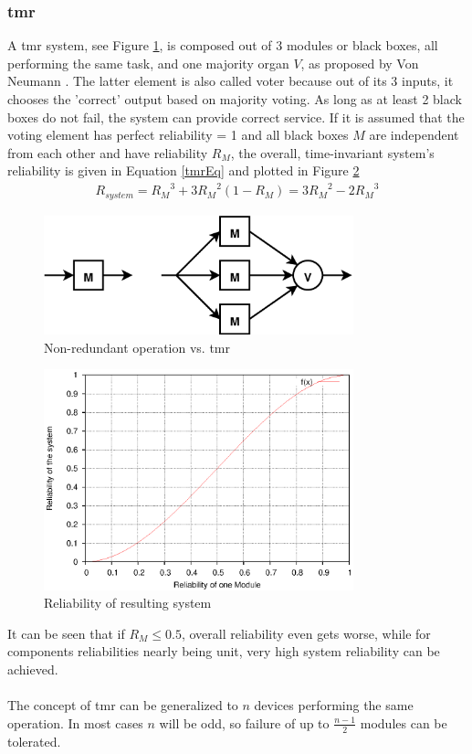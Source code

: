 \subsubsection{\gls{tmr}}
A \gls{tmr} system, see Figure \ref{fig:tmr}, is composed out of 3 modules or black boxes, all performing the same task,	
and one majority organ $V$, as proposed by Von Neumann \cite{vN56}. The latter element
is also called voter because out of its 3 inputs, it chooses the 'correct' output based on majority voting. As long as at least 2 black boxes do not
fail, the system can provide correct service. If it is assumed that the voting element has perfect reliability = 1 and all black boxes $M$ are independent from
each other and have reliability $R_M$, the overall, time-invariant system's reliability is given in Equation \ref{tmrEq} \cite{Lyons:1962:UTR:1661979.1661984} and plotted in Figure \ref{fig:tmrGrp}
\begin{align}\label{tmrEq}
 R_{system} = {R_M}^3 + 3{R_M}^2(1-R_M) = 3{R_M}^2 - 2{R_M}^3
\end{align}
\begin{figure}
    \centering
    \includegraphics[width=0.8\textwidth]{figures/tmr.eps}
    \caption{Non-redundant operation vs. \gls{tmr}}
    \label{fig:tmr}
\end{figure}
\begin{figure}
    \centering
    \includegraphics[width=0.8\textwidth]{figures/tmrGraph.eps}
    \caption{Reliability of resulting system}
    \label{fig:tmrGrp}
\end{figure}
It can be seen that if $R_M \leq 0.5$, overall reliability even gets worse, while for components reliabilities nearly being unit, very high system reliability can
be achieved.
\\
\\
The concept of \gls{tmr} can be generalized to $n$ devices performing
the same operation. In most cases $n$ will be odd, so failure of up to $\frac{n-1}{2}$ modules can be tolerated.

